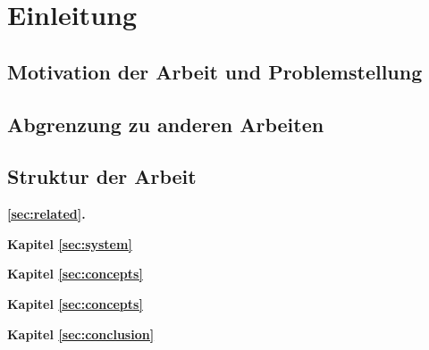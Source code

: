 %
\chapter{Einleitung}
\label{sec:intro}


\Blindtext[2][2]

\section{Motivation der Arbeit und Problemstellung}
\label{sec:intro:motivation}




\section{Abgrenzung zu anderen Arbeiten}
\label{sec:intro:demarcation}

\Blindtext[3][1] \cite{Jurgens:2000,Jurgens:1995,Miede:2011,Kohm:2011,Apple:keynote:2010,Apple:numbers:2010,Apple:pages:2010}


\section{Struktur der Arbeit}
\label{sec:intro:structure}

\textbf{\ref{sec:related}. } \\[0.2em]
\blindtext

\textbf{Kapitel \ref{sec:system}} \\[0.2em]
\blindtext

\textbf{Kapitel \ref{sec:concepts}} \\[0.2em]
\blindtext

\textbf{Kapitel \ref{sec:concepts}} \\[0.2em]
\blindtext

\textbf{Kapitel \ref{sec:conclusion}} \\[0.2em]
\blindtext
